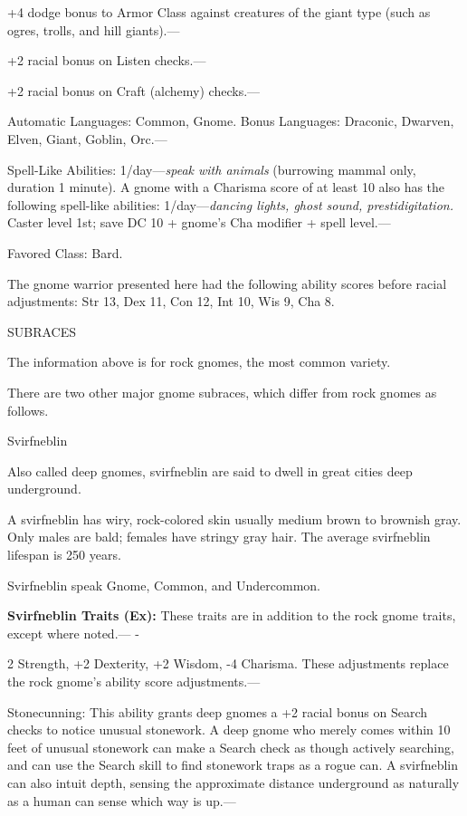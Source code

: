 \documentclass{article}
\begin{document}
+4 dodge bonus to Armor Class against creatures of the giant type (such as ogres, 
trolls, and hill giants).--- 

\parindent=7pt
+2 racial bonus on Listen checks.--- 

\parindent=3pt
+2 racial bonus on Craft (alchemy) checks.---

\parindent=0pt
Automatic Languages: Common, Gnome. Bonus Languages: Draconic, Dwarven, Elven, 
Giant, Goblin, Orc.---

Spell-Like Abilities: 1/day---\textit{speak with animals }(burrowing mammal only, 
duration 1 minute). A gnome with a Charisma score of at least 10 also has the following 
spell-like abilities: 1/day---\textit{dancing lights, ghost sound, prestidigitation. 
}Caster level 1st; save DC 10 + gnome's Cha modifier + spell level.---

Favored Class: Bard.

The gnome warrior presented here had the following ability scores before racial 
adjustments: Str 13, Dex 11, Con 12, Int 10, Wis 9, Cha 8.

SUBRACES

The information above is for rock gnomes, the most common variety.

There are two other major gnome subraces, which differ from rock gnomes as follows.

Svirfneblin

Also called deep gnomes, svirfneblin are said to dwell in great cities deep underground.

A svirfneblin has wiry, rock-colored skin usually medium brown to brownish gray. 
Only males are bald; females have stringy gray hair. The average svirfneblin lifespan 
is 250 years.

Svirfneblin speak Gnome, Common, and Undercommon.

\textbf{Svirfneblin Traits (Ex):} These traits are in addition to the rock gnome 
traits, except where noted.--- -

\parindent=3pt
2 Strength, +2 Dexterity, +2 Wisdom, -4 Charisma. These adjustments replace the 
rock gnome's ability score adjustments.---

\parindent=0pt
Stonecunning: This ability grants deep gnomes a +2 racial bonus on Search checks 
to notice unusual stonework. A deep gnome who merely comes within 10 feet of unusual 
stonework can make a Search check as though actively searching, and can use the 
Search skill to find stonework traps as a rogue can. A svirfneblin can also intuit 
depth, sensing the approximate distance underground as naturally as a human can 
sense which way is up.---
\end{document}
